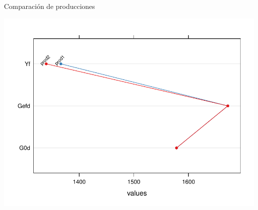\documentclass[aspectratio=169, usenames,svgnames,dvipsnames]{beamer}
\begin{document}
\begin{frame}[label={sec:orga232e0c}]{Comparación de producciones}
\begin{center}
\includegraphics[height=0.9\textheight]{../figuras/ejemplos4.pdf}
\end{center}
\end{frame}
\end{document}
